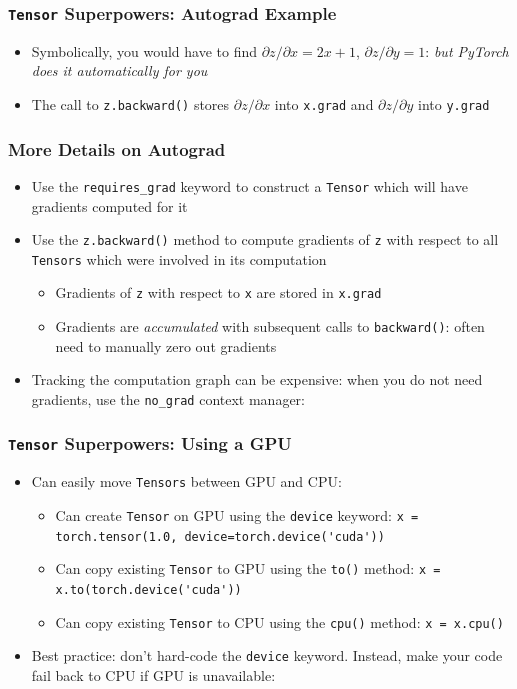 \documentclass[xcolor={x11names,table}]{beamer}
\begin{document}
\begin{frame}
	\frametitle{\lstinline!Tensor! Superpowers: Autograd Example}
	
	
	\begin{itemize}
		\item Symbolically, you would have to find $\partial z/\partial x=2x+1$, $\partial z/\partial y=1$: \emph{but PyTorch does it automatically for you}
		\item The call to \lstinline!z.backward()! stores $\partial z/\partial x$ into \lstinline!x.grad! and $\partial z/\partial y$ into \lstinline!y.grad!
	\end{itemize}
\end{frame}


\begin{frame}
	\frametitle{More Details on Autograd}
	\begin{itemize}
		\item Use the \lstinline!requires_grad! keyword to construct a \lstinline!Tensor! which will have gradients computed for it
		\item Use the \lstinline!z.backward()! method to compute gradients of \lstinline!z! with respect to all \lstinline!Tensors! which were involved in its computation
		\begin{itemize}
			\item Gradients of \lstinline!z! with respect to \lstinline!x! are stored in \lstinline!x.grad!
			\item Gradients are \emph{accumulated} with subsequent calls to \lstinline!backward()!: often need to manually zero out gradients
		\end{itemize}
		\item Tracking the computation graph can be expensive: when you do not need gradients, use the \lstinline!no_grad! context manager:
		
	\end{itemize}
\end{frame}

\begin{frame}
	\frametitle{\lstinline!Tensor! Superpowers: Using a GPU}
	\begin{itemize}
		\item Can easily move \lstinline!Tensors! between GPU and CPU:
		\begin{itemize}
			\item Can create \lstinline!Tensor! on GPU using the \lstinline!device! keyword: \lstinline!x = torch.tensor(1.0, device=torch.device('cuda'))!
			\item Can copy existing \lstinline!Tensor! to GPU using the \lstinline!to()! method: \lstinline!x = x.to(torch.device('cuda'))!
			\item Can copy existing \lstinline!Tensor! to CPU using the \lstinline!cpu()! method: \lstinline!x = x.cpu()!
		\end{itemize}
		\item Best practice: don't hard-code the \lstinline!device! keyword. Instead, make your code fail back to CPU if GPU is unavailable:
		
	\end{itemize}
\end{frame}
\end{document}

